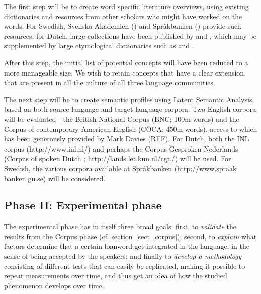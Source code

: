 \documentclass[a4paper]{article}
\begin{document}
The first step will be to create word specific literature overviews, using existing dictionaries and resources from other scholars who might have worked on the words. For Swedish, Svenska Akademien (\citet{Akademien2012}) and Språkbanken (\citet{Universitetet2012}) provide such resources; for Dutch, large collections have been published by \cite{Koops2009} and \cite{Braamkolk2005}, which may be supplemented by large etymological dictionaries such as \citet{Sijs2001} and \citet{Sijs2005}.

After this step, the initial list of potential concepts will have been reduced to a more manageable size. We wish to retain concepts that have a clear extension, that are present in all the culture of all three language communities.

The next step will be to create semantic profiles using Latent Semantic Analysis, based on both source language and target language corpora. Two English corpora will be evaluated - the British National Corpus (BNC; 100m words) and the Corpus of contemporary American English (COCA; 450m words), access to which has been generously provided by Mark Davies (REF). For Dutch, both the INL corpus (http://www.inl.nl/) and perhaps the Corpus Gesproken Nederlands (Corpus of spoken Dutch ; http://lands.let.kun.nl/cgn/) will be used. For Swedish, the various corpora available at Spr\aa kbanken (http://www.spraak\\banken.gu.se) will be considered.


\subsection{Phase II: Experimental phase}

The experimental phase has in itself three broad goals:
first, to \emph{validate} the results from the Corpus phase (cf. section~\ref{sect_corpus});
second, to \emph{explain} what factors determine that a certain loanword get integrated in the language, in the sense of being accepted by the speakers;
and finally to \emph{develop a methodology} consisting of different tests that can easily be replicated, making it possible to repeat measurements over time, and thus get an idea of how the studied phenomenon develops over time.
\end{document}
